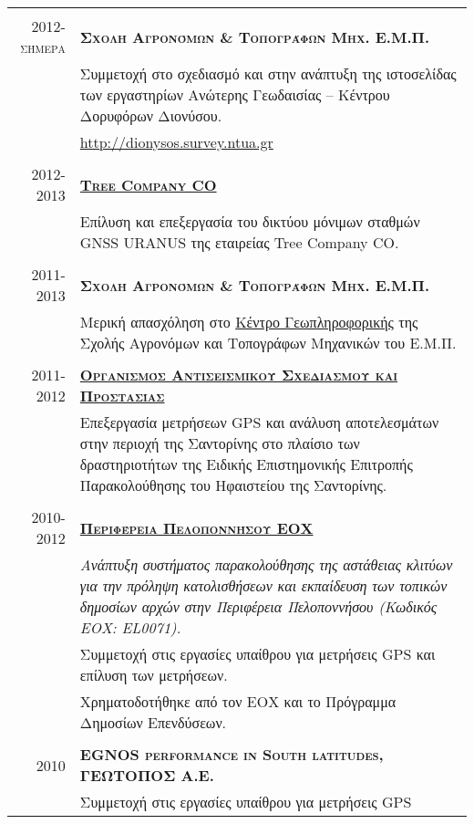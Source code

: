 \documentclass[a4paper,10pt]{article} %
\begin{document}
\begin{longtable}{r|p{13cm}}
\multicolumn{2}{c}{} \\
\textsc{2012-σήμερα} & \textbf{\textsc{Σχολή Αγρονόμων \& Τοπογράφων Μηχ. Ε.Μ.Π.}}\\
  & Συμμετοχή στο σχεδιασμό και στην ανάπτυξη της ιστοσελίδας των εργαστηρίων Ανώτερης Γεωδαισίας – Κέντρου Δορυφόρων Διονύσου.\\
  & \url{http://dionysos.survey.ntua.gr}\\

\multicolumn{2}{c}{} \\
\textsc{2012-2013} & \textbf{\textsc{\href{http://www.treecomp.gr/}{Tree Company CO}}}\\
  & Επίλυση και επεξεργασία του δικτύου μόνιμων σταθμών GNSS URANUS της εταιρείας Tree Company CO.\\

\multicolumn{2}{c}{} \\
\textsc{2011-2013} & \textbf{\textsc{Σχολή Αγρονόμων \& Τοπογράφων Μηχ. Ε.Μ.Π.}}\\
  & Μερική απασχόληση στο \href{http://portal.survey.ntua.gr/main/geocenter/geocen-g.html}{Κέντρο Γεωπληροφορικής} της Σχολής Αγρονόμων και Τοπογράφων Μηχανικών του Ε.Μ.Π.\\

\multicolumn{2}{c}{} \\
\textsc{2011-2012} & \textbf{\textsc{\href{http://www.oasp.gr/}{Οργανισμός Αντισεισμικού Σχεδιασμού και Προστασίας}}}\\
  & Επεξεργασία μετρήσεων GPS και ανάλυση αποτελεσμάτων στην περιοχή της Σαντορίνης στο πλαίσιο των δραστηριοτήτων της Ειδικής Επιστημονικής Επιτροπής Παρακολούθησης του Ηφαιστείου της Σαντορίνης.\\

\multicolumn{2}{c}{}\\
\textsc{2010-2012} & \textbf{\textsc{\href{http://www.landslides.gr/index.php?lang=el}{Περιφέρεια Πελοποννήσου ΕΟΧ}}}\\
  & \textit{Ανάπτυξη συστήματος παρακολούθησης της αστάθειας κλιτύων για την πρόληψη κατολισθήσεων και εκπαίδευση των τοπικών δημοσίων αρχών στην Περιφέρεια Πελοποννήσου (Κωδικός ΕΟΧ: EL0071).}\\
  & Συμμετοχή στις εργασίες υπαίθρου για μετρήσεις GPS και επίλυση των μετρήσεων.\\
  & Χρηματοδοτήθηκε από τον ΕΟΧ και το Πρόγραμμα Δημοσίων Επενδύσεων.\\

\multicolumn{2}{c}{}\\
\textsc{2010} & \textbf{\textsc{EGNOS performance in South latitudes, ΓΕΩΤΟΠΟΣ Α.Ε.}}\\
  & Συμμετοχή στις εργασίες υπαίθρου για μετρήσεις GPS\\

\end{longtable}
\medskip
\end{document}
